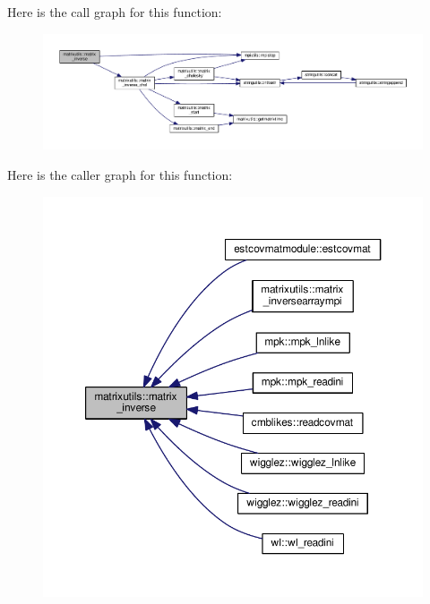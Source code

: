 Here is the call graph for this function\+:
\nopagebreak
\begin{figure}[H]
\begin{center}
\leavevmode
\includegraphics[width=350pt]{namespacematrixutils_aac7ea35062daeadd8fb4ebc86cb42e7a_cgraph}
\end{center}
\end{figure}
Here is the caller graph for this function\+:
\nopagebreak
\begin{figure}[H]
\begin{center}
\leavevmode
\includegraphics[width=350pt]{namespacematrixutils_aac7ea35062daeadd8fb4ebc86cb42e7a_icgraph}
\end{center}
\end{figure}
\mbox{\label{namespacematrixutils_a663d1886940de1ea811bab15859db116}} 
